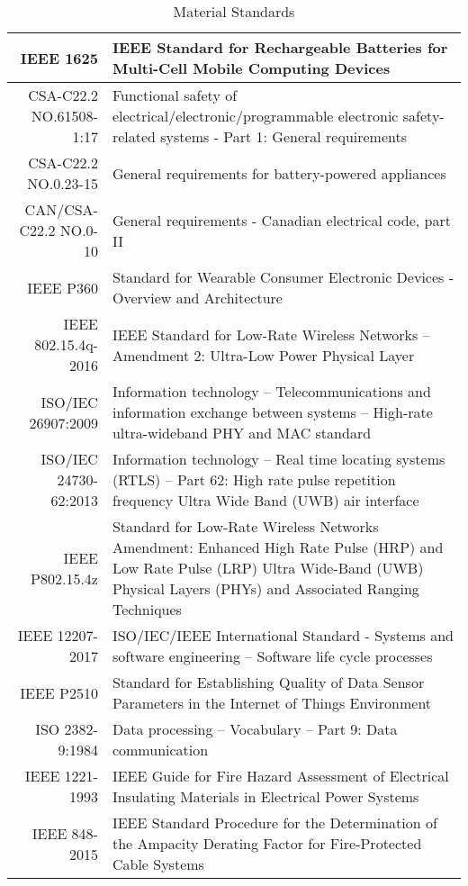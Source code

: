 \bgroup
\def\arraystretch{1.3}
\begin{table}[H]
\centering
\begin{tabular}{ |p{2.5cm} p{11.5cm} | }
\hline
\multicolumn{1}{|r|}{IEEE 1625} & IEEE Standard for Rechargeable Batteries for Multi-Cell Mobile Computing Devices \\ 
\hline
\multicolumn{1}{|r|}{CSA-C22.2 NO.61508-1:17} & Functional safety of electrical/electronic/programmable electronic safety-related systems - Part 1: General requirements \\ 
\hline
\multicolumn{1}{|r|}{CSA-C22.2 NO.0.23-15} & General requirements for battery-powered appliances \\  
\hline
\multicolumn{1}{|r|}{CAN/CSA-C22.2 NO.0-10} & General requirements - Canadian electrical code, part II \\ 
\hline
\multicolumn{1}{|r|}{IEEE P360} & Standard for Wearable Consumer Electronic Devices - Overview and Architecture \\  
\hline
\multicolumn{1}{|r|}{IEEE 802.15.4q-2016} & IEEE Standard for Low-Rate Wireless Networks --Amendment 2: Ultra-Low Power Physical Layer\\ 
\hline
\multicolumn{1}{|r|}{ISO/IEC 26907:2009} & Information technology -- Telecommunications and information exchange between systems -- High-rate ultra-wideband PHY and MAC standard\\  
\hline
\multicolumn{1}{|r|}{ISO/IEC 24730-62:2013} & Information technology -- Real time locating systems (RTLS) -- Part 62: High rate pulse repetition frequency Ultra Wide Band (UWB) air interface\\  
\hline
\multicolumn{1}{|r|}{IEEE P802.15.4z} & Standard for Low-Rate Wireless Networks Amendment: Enhanced High Rate Pulse (HRP) and Low Rate Pulse (LRP) Ultra Wide-Band (UWB) Physical Layers (PHYs) and Associated Ranging Techniques\\  
\hline
\multicolumn{1}{|r|}{IEEE 12207-2017} & ISO/IEC/IEEE International Standard - Systems and software engineering -- Software life cycle processes \\
\hline 
\multicolumn{1}{|r|}{IEEE P2510} & Standard for Establishing Quality of Data Sensor Parameters in the Internet of Things Environment \\ 
\hline
\multicolumn{1}{|r|}{ISO 2382-9:1984} & Data processing -- Vocabulary -- Part 9: Data communication \\
\hline 
\multicolumn{1}{|r|}{IEEE 1221-1993} & IEEE Guide for Fire Hazard Assessment of Electrical Insulating Materials in Electrical Power Systems \\ 
\hline
\multicolumn{1}{|r|}{IEEE 848-2015} & IEEE Standard Procedure for the Determination of the Ampacity Derating Factor for Fire-Protected Cable Systems\\ 
\hline
\end{tabular}
\caption{Material Standards}
\end{table}	
